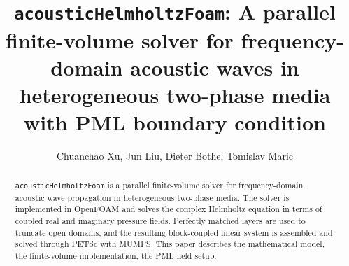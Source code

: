 \documentclass[final,num,12pt]{elsarticle}
\begin{document}
\begin{frontmatter}



\title{\texttt{acousticHelmholtzFoam}: A parallel finite-volume solver for frequency-domain acoustic waves in heterogeneous two-phase media with PML boundary condition}


\author{Chuanchao Xu, Jun Liu, Dieter Bothe, Tomislav Maric} %


\begin{abstract}
\texttt{acousticHelmholtzFoam} is a parallel finite-volume solver for frequency-domain acoustic wave propagation in heterogeneous two-phase media. The solver is implemented in OpenFOAM and solves the complex Helmholtz equation in terms of coupled real and imaginary pressure fields. Perfectly matched layers are used to truncate open domains, and the resulting block-coupled linear system is assembled and solved through PETSc with MUMPS. This paper describes the mathematical model, the finite-volume implementation, the PML field setup.
\end{abstract}


\end{frontmatter}
\end{document}
